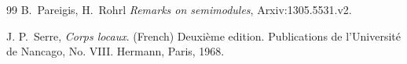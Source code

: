 \documentclass[noams,lp]{compositio}
\begin{document}
\begin{thebibliography}{99}
 B.~Pareigis, H.~Rohrl {\em Remarks on semimodules},  Arxiv:1305.5531.v2.


 J. P.~Serre, {\em Corps locaux}. (French) Deuxi\`eme edition. Publications de l'Universit\'e de Nancago, No. VIII. Hermann, Paris, 1968.



\end{thebibliography}
\end{document}

